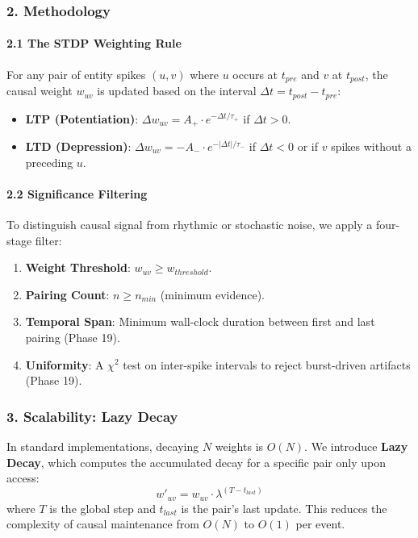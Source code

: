 \subsubsection{2. Methodology}

\paragraph{2.1 The STDP Weighting Rule}
For any pair of entity spikes $(u, v)$ where $u$ occurs at $t_{pre}$ and $v$ at $t_{post}$, the causal weight $w_{uv}$ is updated based on the interval $\Delta t = t_{post} - t_{pre}$:
\begin{itemize}
\item \textbf{LTP (Potent\-iation)}: $\Delta w_{uv} = A_+ \cdot e^{-\Delta t / \tau_+}$ if $\Delta t > 0$.
\item \textbf{LTD (Depression)}: $\Delta w_{uv} = -A_- \cdot e^{-|\Delta t| / \tau_-}$ if $\Delta t < 0$ or if $v$ spikes without a preceding $u$.

\end{itemize}
\paragraph{2.2 Signif\-icance Filtering}
To distinguish causal signal from rhythmic or stochastic noise, we apply a four-stage filter:
\begin{enumerate}
\item \textbf{Weight Threshold}: $w_{uv} \geq w_{threshold}$.
\item \textbf{Pairing Count}: $n \geq n_{min}$ (minimum evidence).
\item \textbf{Temporal Span}: Minimum wall-clock duration between first and last pairing (Phase 19).
\item \textbf{Uniformity}: A $\chi^2$ test on inter-spike intervals to reject burst-driven artifacts (Phase 19).

\end{enumerate}
\subsubsection{3. Scalability: Lazy Decay}
In standard imple\-mentations, decaying $N$ weights is $O(N)$. We introduce \textbf{Lazy Decay}, which computes the accumulated decay for a specific pair only upon access:
\begin{equation}
w'_{uv} = w_{uv} \cdot \lambda^{(T - t_{last})}
\end{equation}
where $T$ is the global step and $t_{last}$ is the pair's last update. This reduces the complexity of causal maintenance from $O(N)$ to $O(1)$ per event.

